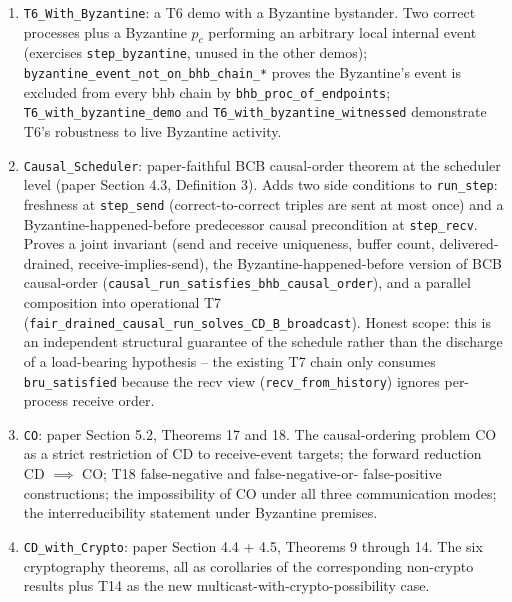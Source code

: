 \documentclass[11pt,a4paper]{article}
\begin{document}
\begin{enumerate}
        $p_a$ relays to $p_c$, $p_c$'s target internal event);
        \verb|multi_bhb_chain| proves the four-edge bhb path,
        \verb|T6_multihop_demo| and \verb|T6_multihop_witnessed|
        mirror the 1-message demo at the bigger scale.
  \item \verb|T6_With_Byzantine|: a T6 demo with a Byzantine
        bystander.  Two correct processes plus a Byzantine $p_c$
        performing an arbitrary local internal event (exercises
        \verb|step_byzantine|, unused in the other demos);
        \verb|byzantine_event_not_on_bhb_chain_*| proves the
        Byzantine's event is excluded from every bhb chain by
        \verb|bhb_proc_of_endpoints|; \verb|T6_with_byzantine_demo|
        and \verb|T6_with_byzantine_witnessed| demonstrate T6's
        robustness to live Byzantine activity.
  \item \verb|Causal_Scheduler|: paper-faithful BCB causal-order
        theorem at the scheduler level (paper Section 4.3,
        Definition 3).  Adds two side conditions to
        \verb|run_step|: freshness at \verb|step_send|
        (correct-to-correct triples are sent at most once) and a
        Byzantine-happened-before predecessor causal precondition
        at \verb|step_recv|.  Proves a joint invariant (send and
        receive uniqueness, buffer count, delivered-drained,
        receive-implies-send), the Byzantine-happened-before
        version of BCB causal-order
        (\verb|causal_run_satisfies_bhb_causal_order|), and a
        parallel composition into operational T7
        (\verb|fair_drained_causal_run_solves_CD_B_broadcast|).
        Honest scope: this is an independent structural guarantee
        of the schedule rather than the discharge of a load-bearing
        hypothesis -- the existing T7 chain only consumes
        \verb|bru_satisfied| because the recv view
        (\verb|recv_from_history|) ignores per-process receive order.
  \item \verb|CO|: paper Section 5.2, Theorems 17 and 18.  The
        causal-ordering problem CO as a strict restriction of CD
        to receive-event targets; the forward reduction CD
        $\implies$ CO; T18 false-negative and false-negative-or-
        false-positive constructions; the impossibility of CO
        under all three communication modes; the interreducibility
        statement under Byzantine premises.
  \item \verb|CD_with_Crypto|: paper Section 4.4 + 4.5, Theorems
        9 through 14.  The six cryptography theorems, all as
        corollaries of the corresponding non-crypto results plus
        T14 as the new multicast-with-crypto-possibility case.
\end{enumerate}

\newpage



\nocite{*}


\end{document}
